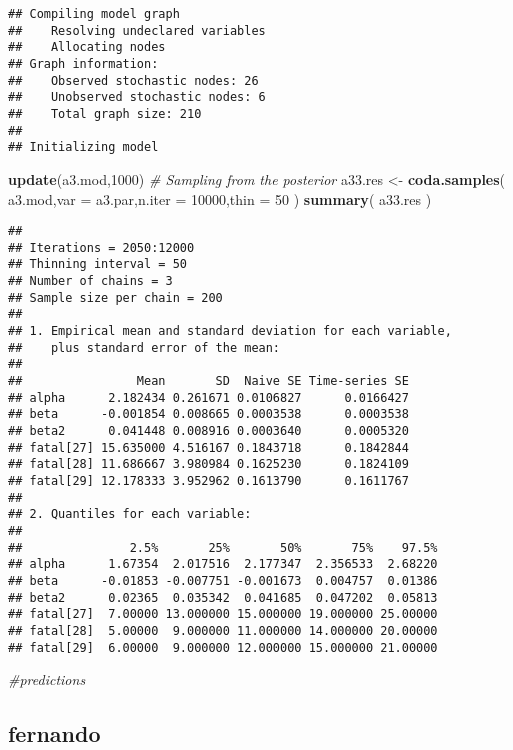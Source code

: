 \documentclass[]{article}
\newenvironment{Shaded}{\begin{snugshade}}{\end{snugshade}}
\newcommand{\KeywordTok}[1]{\textcolor[rgb]{0.13,0.29,0.53}{\textbf{#1}}}
\newcommand{\DataTypeTok}[1]{\textcolor[rgb]{0.13,0.29,0.53}{#1}}
\newcommand{\DecValTok}[1]{\textcolor[rgb]{0.00,0.00,0.81}{#1}}
\newcommand{\StringTok}[1]{\textcolor[rgb]{0.31,0.60,0.02}{#1}}
\newcommand{\CommentTok}[1]{\textcolor[rgb]{0.56,0.35,0.01}{\textit{#1}}}
\newcommand{\NormalTok}[1]{#1}
\begin{document}
\begin{verbatim}
## Compiling model graph
##    Resolving undeclared variables
##    Allocating nodes
## Graph information:
##    Observed stochastic nodes: 26
##    Unobserved stochastic nodes: 6
##    Total graph size: 210
## 
## Initializing model
\end{verbatim}

\begin{Shaded}
\begin{Highlighting}[]
 \KeywordTok{update}\NormalTok{(a3.mod,}\DecValTok{1000}\NormalTok{)}
 \CommentTok{# Sampling from the posterior}
\NormalTok{ a33.res <-}\StringTok{ }\KeywordTok{coda.samples}\NormalTok{( a3.mod,}\DataTypeTok{var =}\NormalTok{ a3.par,}\DataTypeTok{n.iter =} \DecValTok{10000}\NormalTok{,}\DataTypeTok{thin =} \DecValTok{50}\NormalTok{ )}
 \KeywordTok{summary}\NormalTok{( a33.res )}
\end{Highlighting}
\end{Shaded}

\begin{verbatim}
## 
## Iterations = 2050:12000
## Thinning interval = 50 
## Number of chains = 3 
## Sample size per chain = 200 
## 
## 1. Empirical mean and standard deviation for each variable,
##    plus standard error of the mean:
## 
##                Mean       SD  Naive SE Time-series SE
## alpha      2.182434 0.261671 0.0106827      0.0166427
## beta      -0.001854 0.008665 0.0003538      0.0003538
## beta2      0.041448 0.008916 0.0003640      0.0005320
## fatal[27] 15.635000 4.516167 0.1843718      0.1842844
## fatal[28] 11.686667 3.980984 0.1625230      0.1824109
## fatal[29] 12.178333 3.952962 0.1613790      0.1611767
## 
## 2. Quantiles for each variable:
## 
##               2.5%       25%       50%       75%    97.5%
## alpha      1.67354  2.017516  2.177347  2.356533  2.68220
## beta      -0.01853 -0.007751 -0.001673  0.004757  0.01386
## beta2      0.02365  0.035342  0.041685  0.047202  0.05813
## fatal[27]  7.00000 13.000000 15.000000 19.000000 25.00000
## fatal[28]  5.00000  9.000000 11.000000 14.000000 20.00000
## fatal[29]  6.00000  9.000000 12.000000 15.000000 21.00000
\end{verbatim}

\begin{Shaded}
\begin{Highlighting}[]
 \CommentTok{#predictions}
\end{Highlighting}
\end{Shaded}

\subsection{fernando}\label{fernando}
\end{document}
